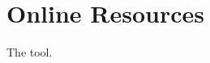 \documentclass[
]{ceurart}
\begin{document}


\appendix

\section{Online Resources}
The tool.
\end{document}
